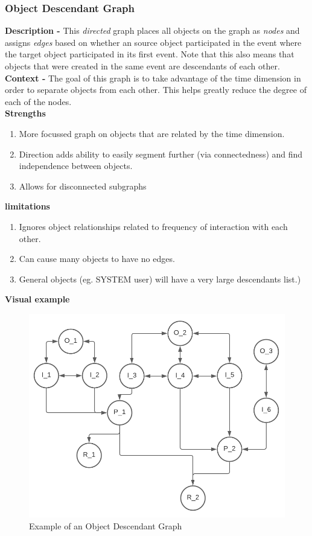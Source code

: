 \documentclass{article}
\begin{document}
\subsubsection{Object Descendant Graph}
\textbf{Description -} This \emph{directed} graph places all objects on the graph as \emph{nodes} and assigns \emph{edges} based on whether an source object participated in the event where the target object participated in its first event. Note that this also means that objects that were created in the same event are descendants of each other.\\

\noindent \textbf{Context -} The goal of this graph is to take advantage of the time dimension in order to separate objects from each other. This helps greatly reduce the degree of each of the nodes.
\\

\noindent\textbf{Strengths}
\begin{enumerate}
	\item More focussed graph on objects that are related by the time dimension.
	\item Direction adds ability to easily segment further (via connectedness) and find independence between objects.
	\item Allows for disconnected subgraphs
\end{enumerate}

\noindent\textbf{limitations}
\begin{enumerate}
	\item Ignores object relationships related to frequency of interaction with each other.
	\item Can cause many objects to have no edges.
	\item General objects (eg. SYSTEM user) will have a very large descendants list.)
\end{enumerate}

\noindent\textbf{Visual example}
\begin{figure}[h]
	\centering
	\includegraphics[scale=0.5]{images/descendants.png}
	\caption{Example of an Object Descendant Graph}
	\label{fig:descendant-graph}
\end{figure}
\end{document}
